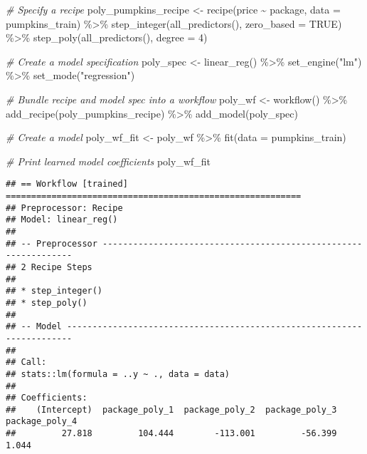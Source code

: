 \documentclass[
]{article}
\newenvironment{Shaded}{\begin{snugshade}}{\end{snugshade}}
\newcommand{\AttributeTok}[1]{\textcolor[rgb]{0.77,0.63,0.00}{#1}}
\newcommand{\CommentTok}[1]{\textcolor[rgb]{0.56,0.35,0.01}{\textit{#1}}}
\newcommand{\ConstantTok}[1]{\textcolor[rgb]{0.00,0.00,0.00}{#1}}
\newcommand{\DecValTok}[1]{\textcolor[rgb]{0.00,0.00,0.81}{#1}}
\newcommand{\FunctionTok}[1]{\textcolor[rgb]{0.00,0.00,0.00}{#1}}
\newcommand{\NormalTok}[1]{#1}
\newcommand{\OtherTok}[1]{\textcolor[rgb]{0.56,0.35,0.01}{#1}}
\newcommand{\SpecialCharTok}[1]{\textcolor[rgb]{0.00,0.00,0.00}{#1}}
\newcommand{\StringTok}[1]{\textcolor[rgb]{0.31,0.60,0.02}{#1}}
\begin{document}
\begin{Shaded}
\begin{Highlighting}[]
\CommentTok{\# Specify a recipe}
\NormalTok{poly\_pumpkins\_recipe }\OtherTok{\textless{}{-}}
  \FunctionTok{recipe}\NormalTok{(price }\SpecialCharTok{\textasciitilde{}}\NormalTok{ package, }\AttributeTok{data =}\NormalTok{ pumpkins\_train) }\SpecialCharTok{\%\textgreater{}\%}
  \FunctionTok{step\_integer}\NormalTok{(}\FunctionTok{all\_predictors}\NormalTok{(), }\AttributeTok{zero\_based =} \ConstantTok{TRUE}\NormalTok{) }\SpecialCharTok{\%\textgreater{}\%} 
  \FunctionTok{step\_poly}\NormalTok{(}\FunctionTok{all\_predictors}\NormalTok{(), }\AttributeTok{degree =} \DecValTok{4}\NormalTok{)}


\CommentTok{\# Create a model specification}
\NormalTok{poly\_spec }\OtherTok{\textless{}{-}} \FunctionTok{linear\_reg}\NormalTok{() }\SpecialCharTok{\%\textgreater{}\%} 
  \FunctionTok{set\_engine}\NormalTok{(}\StringTok{"lm"}\NormalTok{) }\SpecialCharTok{\%\textgreater{}\%} 
  \FunctionTok{set\_mode}\NormalTok{(}\StringTok{"regression"}\NormalTok{)}


\CommentTok{\# Bundle recipe and model spec into a workflow}
\NormalTok{poly\_wf }\OtherTok{\textless{}{-}} \FunctionTok{workflow}\NormalTok{() }\SpecialCharTok{\%\textgreater{}\%} 
  \FunctionTok{add\_recipe}\NormalTok{(poly\_pumpkins\_recipe) }\SpecialCharTok{\%\textgreater{}\%} 
  \FunctionTok{add\_model}\NormalTok{(poly\_spec)}


\CommentTok{\# Create a model}
\NormalTok{poly\_wf\_fit }\OtherTok{\textless{}{-}}\NormalTok{ poly\_wf }\SpecialCharTok{\%\textgreater{}\%} 
  \FunctionTok{fit}\NormalTok{(}\AttributeTok{data =}\NormalTok{ pumpkins\_train)}


\CommentTok{\# Print learned model coefficients}
\NormalTok{poly\_wf\_fit}
\end{Highlighting}
\end{Shaded}

\begin{verbatim}
## == Workflow [trained] ==========================================================
## Preprocessor: Recipe
## Model: linear_reg()
## 
## -- Preprocessor ----------------------------------------------------------------
## 2 Recipe Steps
## 
## * step_integer()
## * step_poly()
## 
## -- Model -----------------------------------------------------------------------
## 
## Call:
## stats::lm(formula = ..y ~ ., data = data)
## 
## Coefficients:
##    (Intercept)  package_poly_1  package_poly_2  package_poly_3  package_poly_4  
##         27.818         104.444        -113.001         -56.399           1.044
\end{verbatim}
\end{document}
